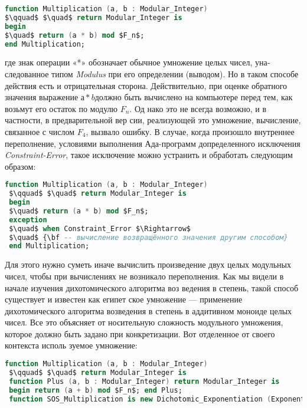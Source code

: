 \newpage

\begin{lstlisting}[mathescape=true, language=Ada, basicstyle=\small]
function Multiplication (a, b : Modular_Integer)
$\qquad$ $\quad$ return Modular_Integer is
begin
$\quad$ return (a * b) mod $F_n$;
end Multiplication;
\end{lstlisting}

где знак операции «*» обозначает обычное умножение целых чисел, уна­
следованное типом {\it Modulus} при его определении (выводом). Но в таком
способе действия есть и отрицательная сторона. Действительно, при
оценке обратного значения выражение $а * b $должно быть вычислено на
компьютере перед тем, как возьмут его остаток по модулю $F_n$. Од­
нако это не всегда возможно, и в частности, в предварительной вер­
сии, реализующей это умножение, вычисление, связанное с числом $F_4$,
вызвало ошибку. В случае, когда произошло внутреннее переполнение,
условиями выполнения Ада-программ 
допределенного исключения {\it Constraint-Error}, такое исключение можно
устранить и обработать следующим образом:

\begin{lstlisting}[mathescape=true, language=Ada, basicstyle=\small]
 function Multiplication (a, b : Modular_Integer)
 $\qquad$ $\quad$ return Modular_Integer is
 begin
 $\quad$ return (a * b) mod $F_n$;
 exception
 $\quad$ when Constraint_Error $\Rightarrow$
 $\quad$ {\bf -- вычисление возвращённого значения другим способом}
 end Multiplication;
 \end{lstlisting}
 
 Для этого нужно суметь иначе вычислить произведение двух целых
модульных чисел, чтобы при вычислениях не возникало переполнения.
Как мы видели в начале изучения дихотомического алгоритма воз­
ведения в степень, такой способ существует и известен как египет­
ское умножение — применение дихотомического алгоритма возведения
в степень в аддитивном моноиде целых чисел. Все это объясняет от­
носительную сложность модульного умножения, которое должно быть
задано при конкретизации. Вот отделенное от своего контекста исполь­
зуемое умножение:
\begin{lstlisting}[mathescape=true, language=Ada,  basicstyle=\small]
function Multiplication (a, b : Modular_Integer)
 $\qquad$ $\quad$ return Modular_Integer is
 function Plus (a, b : Modular_Integer) return Modular_Integer is
 begin return (a + b) mod $F_n$; end Plus;
 function SOS_Multiplication is new Dichotomic_Exponentiation (Exponent $\Rightarrow$ Modular_Integer, Monoid_Element $\Rightarrow$ Modular_Integer, "*" $\Rightarrow$ Plus, Monoid_Unit $\Rightarrow$ 0);
 \end{lstlisting}
 
